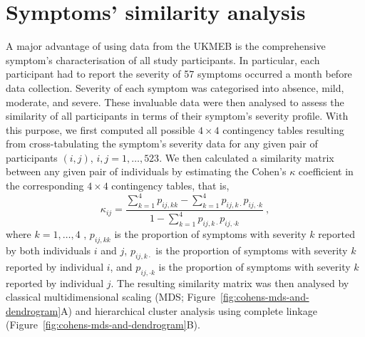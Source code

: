 \section{Symptoms' similarity analysis}

A major advantage of using data from the UKMEB is the comprehensive symptom's characterisation of all study participants. In particular, each participant  had to report the severity of 57  symptoms occurred a month before data collection. Severity of each symptom was categorised into absence, mild, moderate, and severe. These invaluable data were then analysed to assess the similarity of all participants in terms of their symptom's severity profile. With this purpose, we first computed all possible $4 \times 4$ contingency tables resulting from cross-tabulating the symptom's severity data for any given pair of participants $(i, j)$, $i, j = 1, \dotsc, 523$. We then calculated a similarity matrix between any given pair of individuals by estimating the Cohen's $\kappa$ coefficient \citep{agresti2011CategoricalData} in the corresponding $4 \times 4$ contingency tables, that is,
% 
\begin{equation}
    \kappa_{ij} = \frac{\sum^4_{k=1}{p_{ij,kk}} - \sum^4_{k=1}{p_{ij,k\cdot} p_{ij,\cdot k}}}{1-\sum_{k=1}^4{p_{ij,k\cdot}p_{ij,\cdot k}}}\ ,
    \label{eq:cohens-kappa-coef}
\end{equation}
% 
where $k = 1, \dotsc, 4$ , $p_{ij,kk}$ is the proportion of symptoms with severity $k$ reported by both individuals $i$ and $j$, $p_{ij,k\cdot} $ is the proportion of symptoms with severity $k$ reported by individual $i$, and $p_{ij,\cdot k} $ is the proportion of symptoms with severity $k$ reported by individual $j$. The resulting similarity matrix was then analysed by classical multidimensional scaling (MDS; Figure~\ref{fig:cohens-mds-and-dendrogram}A) and hierarchical cluster analysis using complete linkage (Figure~\ref{fig:cohens-mds-and-dendrogram}B).

